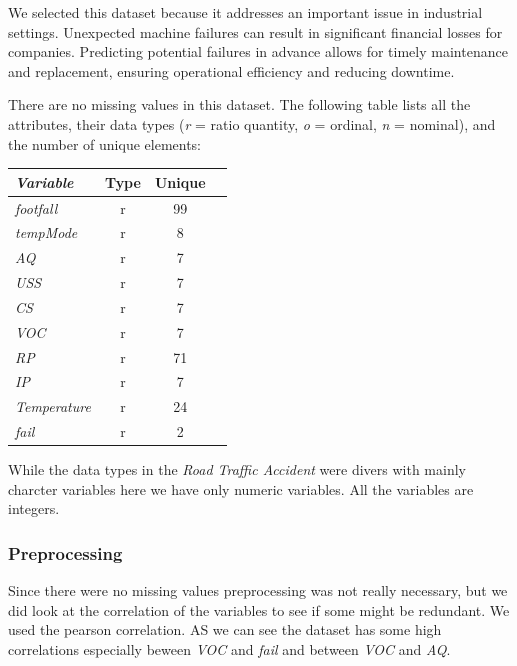 \documentclass{article}
\begin{document}
We selected this dataset because it addresses an important issue in industrial settings. Unexpected machine failures can result in significant financial losses for companies. Predicting potential failures in advance allows for timely maintenance and replacement, ensuring operational efficiency and reducing downtime.

\noindent There are no missing values in this dataset. The following table lists all the attributes, their data types (\textit{r} = ratio quantity, \textit{o} = ordinal, \textit{n} = nominal), and the number of unique elements:

\setlength{\tabcolsep}{1pt} %
    \begin{table}[H]
        \begin{tabular}{l@{}c@{}c@{}c}
                \textit{\textbf{Variable}} & \textbf{Type} \hspace{0.3em} & \textbf{Unique} \hspace{0.3em} \\\hline
                \textit{footfall } & r & 99 \\
                \textit{tempMode} & r & 8 \\
                \textit{AQ} & r & 7 \\
                \textit{USS} & r & 7 \\
                \textit{CS} & r & 7 \\
                \textit{VOC} & r & 7  \\
                \textit{RP} & r & 71 \\
                \textit{IP} & r & 7 \\
                \textit{Temperature} & r & 24 \\
                \textit{fail} & r & 2 
        \end{tabular}
    \end{table}

While the data types in the \textit{Road Traffic Accident} were divers with mainly charcter variables here we have only numeric variables. All the variables are integers.

\subsubsection{Preprocessing}
Since there were no missing values preprocessing was not really necessary, but we did look at the correlation of the variables to see if some might be redundant. We used the pearson correlation. AS we can see the dataset has some high correlations especially beween \textit{VOC} and \textit{fail} and between \textit{VOC} and \textit{AQ}.
\end{document}
